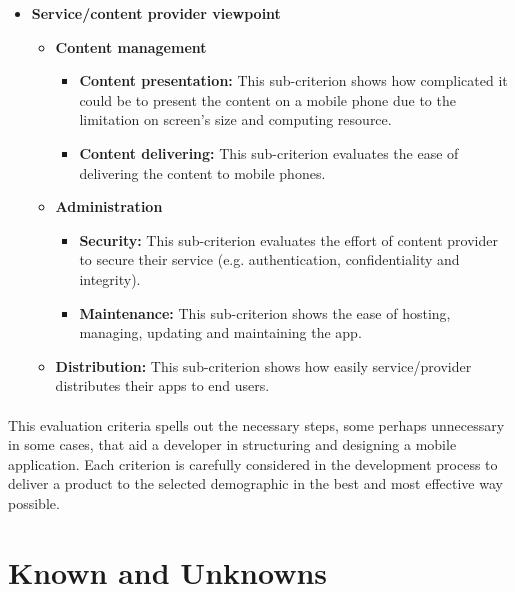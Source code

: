 \begin{itemize}
                    \item\textbf{Service/content provider viewpoint}
                    \begin{itemize}
                        \item \textbf{Content management}
                        \begin{itemize}
                            \item \textbf{Content presentation:} This sub-criterion shows how complicated it could be to present the content on a mobile phone due to the limitation on screen’s size and computing resource.
                            \item \textbf{Content delivering:} This sub-criterion evaluates the ease of delivering the content to mobile phones.
                        \end{itemize}
                        
                        \item\textbf{ Administration}
                        \begin{itemize}
                            \item \textbf{Security:} This sub-criterion evaluates the effort of content provider to secure their service (e.g. authentication, confidentiality and integrity).
                            \item\textbf{Maintenance:} This sub-criterion shows the ease of hosting, managing, updating and maintaining the app.
                        \end{itemize}
                        
                        \item\textbf{Distribution:} This sub-criterion shows how easily service/provider distributes their apps to end users. \cite{Mobile_App_Paradigms}
                    \end{itemize}
            \end{itemize}
\paragraph{}
This evaluation criteria spells out the necessary steps, some perhaps unnecessary in some cases, that aid a developer in structuring and designing a mobile application. Each criterion is carefully considered in the development process to deliver a product to the selected demographic in the best and most effective way possible.
   
\section{Known and Unknowns}

